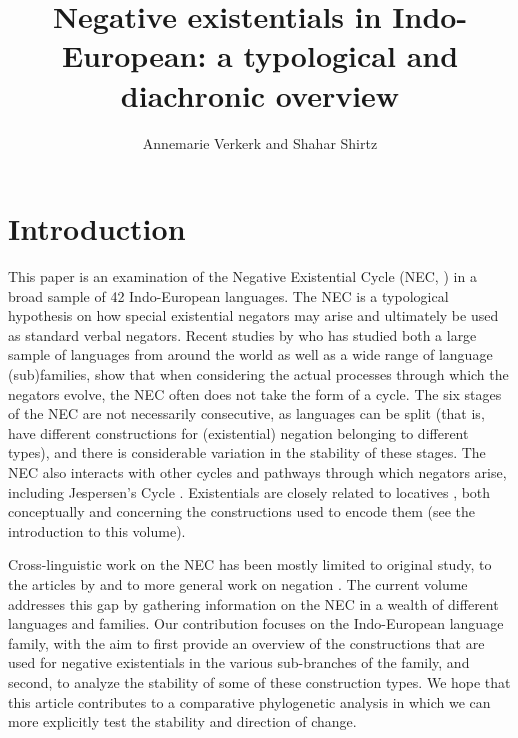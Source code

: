﻿\documentclass[output=paper]{langsci/langscibook}
\title{Negative existentials in Indo-European: a typological and diachronic overview}
\author{Annemarie Verkerk\affiliation{Max Planck Institute for the Science
of Human History and Universität des Saarlandes} and
Shahar Shirtz\affiliation{University of Oregon}%
}
\begin{document}
\maketitle

\section{Introduction}\label{sec:ieur-1}

This paper is an examination of the Negative Existential Cycle (NEC,
\citealt{Croft1991}) in a broad sample of 42
Indo-European languages. The
NEC is a typological hypothesis on how special existential negators may
arise and ultimately be used as standard verbal negators. Recent studies by
\textcites{Veselinova2013}{Veselinova2014}{Veselinova2015}{Veselinova2016} who has studied both a large sample of
languages from around the world as well as a wide range of language
(sub)families, show that when considering the actual processes through
which the negators evolve, the NEC often does not take the form of a cycle.
The six stages of the NEC are not necessarily consecutive, as languages can
be split (that is, have different constructions for (existential) negation
belonging to different types), and there is considerable variation in the
stability of these stages. The NEC also interacts with other cycles and
pathways through which negators arise, including Jespersen's Cycle
\parencite[see][]{Gelderen2019}. Existentials are closely related to
locatives \parencites{Clark1978}{Creissels2013ieur}, both conceptually and
concerning the constructions used to encode them (see the introduction to
this volume). 

Cross-linguistic work on the NEC has been mostly limited to
 original study, to the articles by
\textcites{Veselinova2013}{Veselinova2014}{Veselinova2015}{Veselinova2016}
    and to more general work on negation 
\parencites{KahrelBerg1994}{CyfferEbermann2009}{Budd2010}{WillisLucas2013-ieur}.
The current volume addresses this gap by gathering information on the NEC
in a wealth of different languages and
families. Our contribution focuses on the Indo-European language family,
with the aim to first provide an overview of the constructions that are
used for negative existentials in the various sub-branches of the family,
and second, to analyze the stability of some of these construction types.
We hope that this article contributes to a comparative phylogenetic
analysis in which we can more explicitly test the stability and direction
of change. 
\end{document}
